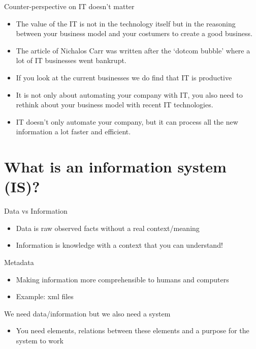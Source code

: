 \documentclass{article}
\begin{document}
Counter-perspective on IT doesn't matter

\begin{itemize}
\item  The value of the IT is not in the technology itself but in the reasoning between your business model and your costumers to create a good business.

\item  The article of Nichalos Carr was written after the `dotcom bubble' where a lot of IT businesses went bankrupt.

\item  If you look at the current businesses we do find that IT is productive

\item  It is not only about automating your company with IT, you also need to rethink about your business model with recent IT technologies.

\item  IT doesn't only automate your company, but it can process all the new information a lot faster and efficient.
\end{itemize}

\section{What is an information system (IS)?}

Data vs Information

\begin{itemize}
\item  Data is raw observed facts without a real context/meaning

\item  Information is knowledge with a context that you can understand!
\end{itemize}

Metadata

\begin{itemize}
\item  Making information more comprehensible to humans and computers

\item  Example: xml files
\end{itemize}

We need data/information but we also need a system

\begin{itemize}
\item  You need elements, relations between these elements and a purpose for the system to work
\end{itemize}
\end{document}
